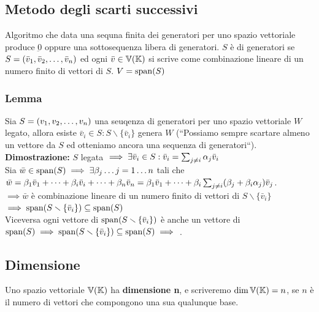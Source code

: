 \documentclass[../main.tex]{subfiles}
\begin{document}
\subsection{Metodo degli scarti successivi}
Algoritmo che data una sequna finita dei generatori per uno spazio vettoriale
produce $\underbar{0}$ oppure una sottosequenza libera di generatori. $S$ è di
generatori se $S= (\bar{v}_1, \bar{v}_2, \ldots, \bar{v}_{n})$ ed ogni $\bar{v}\in\mathbb{V} (\mathbb{K})$ si scrive come
combinazione lineare di un numero finito di vettori di $S$. $V = \operatorname{span}(S)$

\subsubsection{Lemma}
Sia $S=(v_1, v_2, \ldots, v_{n})$ una seuqenza di generatori per uno spazio vettoriale $W$
legato, allora esiste $\bar{v}_i\in S:S\smallsetminus\{\bar v_i\}$ genera $W$
(``Possiamo sempre scartare almeno un vettore da $S$ ed otteniamo ancora una
sequenza di generatori``).\\ \textbf{Dimostrazione:} $S$ legata
$\implies\exists\bar{v}_i\in S:\bar v_i=\sum_{j\ne i}^{}\alpha_j\bar v_i$ \\ Sia
$\bar{w}\in\operatorname{span}(S)\implies\exists\beta_j\ldots j=1\ldots n$ tali che
$\bar{w}=\beta_1\bar{v}_1+\cdots+\beta_i\bar{v}_i+\cdots+\beta_n\bar{v}_n =
    \beta_1\bar{v}_1+\cdots+\beta_i\sum_{j\ne i}^{}(\beta_j+\beta_i\alpha_j)\bar{v}_j$.\\
$\implies \bar{w}$ è combinazione lineare di un numero finito di vettori di
$S\smallsetminus\{\bar{v}_i\}$\\ $\implies
    \operatorname{span}(S\smallsetminus\{\bar{v}_i\})\subseteq\operatorname{span}(S)$\\ Viceversa ogni vettore
di $\operatorname{span}(S\smallsetminus\{\bar{v}_i\})$ è anche un vettore di
$\operatorname{span}(S)\implies\operatorname{span}(S\smallsetminus\{\bar{v}_i\})\subseteq\operatorname{span}(S)\implies$
.

\subsection{Dimensione}
Uno spazio vettoriale $\mathbb{V} (\mathbb{K})$ ha \textbf{dimensione n}, e scriveremo $\dim\mathbb{V} (\mathbb{K}) = n$,
se $n$ è il numero di vettori che compongono una sua qualunque base.
\end{document}
